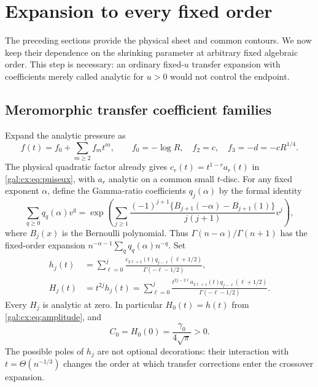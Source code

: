 \documentclass[11pt,letterpaper]{article}
\numberwithin{equation}{section}
\theoremstyle{definition}\newtheorem{definition}[theorem]{Definition}
\theoremstyle{remark}\newtheorem{remark}[theorem]{Remark}
\begin{document}
\section{Expansion to every fixed order}\label{gal:cx:sec:allorders}
The preceding sections provide the physical sheet and common contours. We now keep their dependence on the shrinking parameter at arbitrary fixed algebraic order. This step is necessary: an ordinary fixed-$u$ transfer expansion with coefficients merely called analytic for $u>0$ would not control the endpoint.

\subsection{Meromorphic transfer coefficient families}
Expand the analytic pressure as
\begin{equation}\label{gal:cx:eq:pressure-series}
f(t)=f_0+\sum_{m\ge2}f_mt^m,\qquad
f_0=-\log R,\quad f_2=c,\quad f_3=-d=-cR^{1/4}.
\end{equation}
The physical quadratic factor already gives
$c_r(t)=t^{1-r}a_r(t)$ in \eqref{gal:cx:eq:puiseux}, with $a_r$ analytic on a common small $t$-disc. For any fixed exponent $\alpha$, define the Gamma-ratio coefficients $q_j(\alpha)$ by the formal identity
\begin{equation}\label{gal:cx:eq:q-generator}
\sum_{q\ge0}q_q(\alpha)v^q
=\exp\!\left(\sum_{j\ge1}
\frac{(-1)^{j+1}\{B_{j+1}(-\alpha)-B_{j+1}(1)\}}
{j(j+1)}v^j\right),
\end{equation}
where $B_j(x)$ is the Bernoulli polynomial. Thus
$\Gamma(n-\alpha)/\Gamma(n+1)$ has the fixed-order expansion
$n^{-\alpha-1}\sum_q q_q(\alpha)n^{-q}$.
Set
\begin{equation}\label{gal:cx:eq:meromorphic}
\begin{aligned}
h_j(t)&=\sum_{\ell=0}^{j}
\frac{c_{2\ell+1}(t)q_{j-\ell}(\ell+1/2)}{\Gamma(-\ell-1/2)},\\
H_j(t)&=t^{2j}h_j(t)
=\sum_{\ell=0}^{j}
\frac{t^{2j-2\ell}a_{2\ell+1}(t)q_{j-\ell}(\ell+1/2)}
{\Gamma(-\ell-1/2)}.
\end{aligned}
\end{equation}
Every $H_j$ is analytic at zero. In particular $H_0(t)=h(t)$ from \eqref{gal:cx:eq:amplitude}, and
\begin{equation}\label{gal:cx:eq:C0}
C_0=H_0(0)=\frac{\gamma_0}{4\sqrt\pi}>0.
\end{equation}
The possible poles of $h_j$ are not optional decorations: their interaction with $t=\Theta(n^{-1/3})$ changes the order at which transfer corrections enter the crossover expansion.
\end{document}
